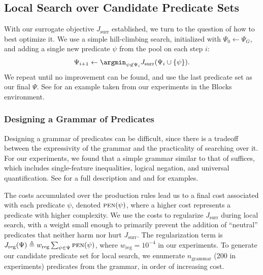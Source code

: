 \subsection{Local Search over Candidate Predicate Sets}
\label{subsubsec:localsearch}



With our surrogate objective $J_{\text{surr}}$ established, we turn to the question of how to best optimize it.
We use a simple hill-climbing search, initialized with $\Psi_0 \gets \Psi_G$, and adding a single new predicate $\psi$ from the pool on each step $i$: $$\Psi_{i+1} \gets \argmin_{\psi \not\in \Psi_i} J_{\text{surr}}(\Psi_i \cup \{\psi\}).$$
We repeat until no improvement can be found, and use the last predicate set as our final $\Psi$.
See  for an example taken from our experiments in the Blocks environment.

\subsubsection{Designing a Grammar of Predicates}
\label{subsubsec:grammar}

Designing a grammar of predicates can be difficult, since there is a tradeoff between the expressivity of the grammar and the practicality of searching over it.
For our experiments, we found that a simple grammar similar to that of \citet{pasula2007learning} suffices, which includes single-feature inequalities, logical negation, and universal quantification.
See  for a full description and  and  for examples.

The costs accumulated over the production rules lead us to a final cost associated with each predicate $\psi$, denoted $\textsc{pen}(\psi)$, where a higher cost represents a predicate with higher complexity.
We use the costs to regularize $J_{\text{surr}}$ during local search, with a weight small enough to primarily prevent the addition of ``neutral'' predicates that neither harm nor hurt $J_{\text{surr}}$.
The regularization term is $J_{\text{reg}}(\Psi) \triangleq w_{\text{reg}} \sum_{\psi \in \Psi} \textsc{pen}(\psi)$, where $w_{\text{reg}} = 10^{-4}$ in our experiments.
To generate our candidate predicate set for local search, we enumerate $n_{\text{grammar}}$ (200 in experiments) predicates from the grammar, in order of increasing cost.


